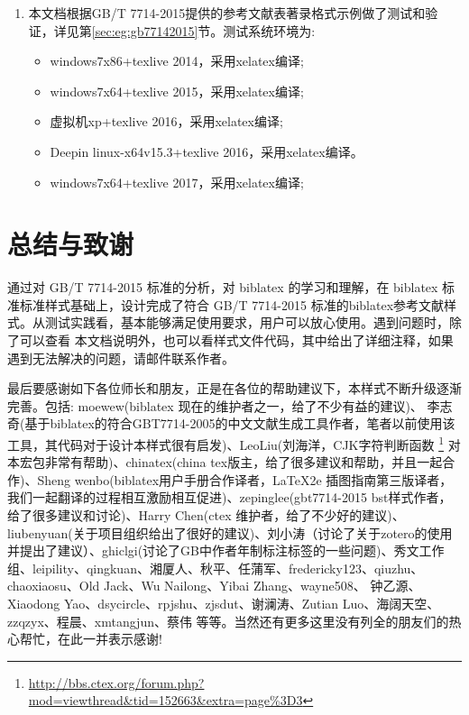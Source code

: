 \begin{enumerate}
  \item 本文档根据GB/T 7714-2015提供的参考文献表著录格式示例做了测试和验证，详见第\ref{sec:eg:gb77142015}节。测试系统环境为:
    \begin{itemize}
    \item windows7x86+texlive 2014，采用xelatex编译;

    \item windows7x64+texlive 2015，采用xelatex编译;

    \item 虚拟机xp+texlive 2016，采用xelatex编译;

    \item Deepin linux-x64v15.3+texlive 2016，采用xelatex编译。

    \item windows7x64+texlive 2017，采用xelatex编译;
    \end{itemize}

\end{enumerate}


\section{总结与致谢}

通过对 GB/T 7714-2015 标准的分析，对 biblatex 的学习和理解，在 biblatex 标准标准样式基础上，设计完成了符合 GB/T 7714-2015 标准的biblatex参考文献样式。从测试实践看，基本能够满足使用要求，用户可以放心使用。遇到问题时，除了可以查看
本文档说明外，也可以看样式文件代码，其中给出了详细注释，如果遇到无法解决的问题，请邮件联系作者。


最后要感谢如下各位师长和朋友，正是在各位的帮助建议下，本样式不断升级逐渐完善。包括: moewew(biblatex 现在的维护者之一，给了不少有益的建议)、 李志奇(基于biblatex的符合GBT7714-2005的中文文献生成工具作者，笔者以前使用该工具，其代码对于设计本样式很有启发)、LeoLiu(刘海洋，CJK字符判断函数
\footnote{\url{http://bbs.ctex.org/forum.php?mod=viewthread&tid=152663&extra=page\%3D3}} 对本宏包非常有帮助)、chinatex(china tex版主，给了很多建议和帮助，并且一起合作)、Sheng wenbo(biblatex用户手册合作译者，LaTeX2e 插图指南第三版译者，我们一起翻译的过程相互激励相互促进)、zepinglee(gbt7714-2015 bst样式作者，给了很多建议和讨论)、Harry Chen(ctex 维护者，给了不少好的建议)、liubenyuan(关于项目组织给出了很好的建议)、刘小涛（讨论了关于zotero的使用并提出了建议）、ghiclgi(讨论了GB中作者年制标注标签的一些问题)、秀文工作组、leipility、qingkuan、湘厦人、秋平、任蒲军、fredericky123、qiuzhu、chaoxiaosu、Old Jack、Wu Nailong、Yibai Zhang、wayne508、 钟乙源、Xiaodong Yao、dsycircle、rpjshu、zjsdut、谢澜涛、Zutian Luo、海阔天空、zzqzyx、程晨、xmtangjun、蔡伟 等等。当然还有更多这里没有列全的朋友们的热心帮忙，在此一并表示感谢!


